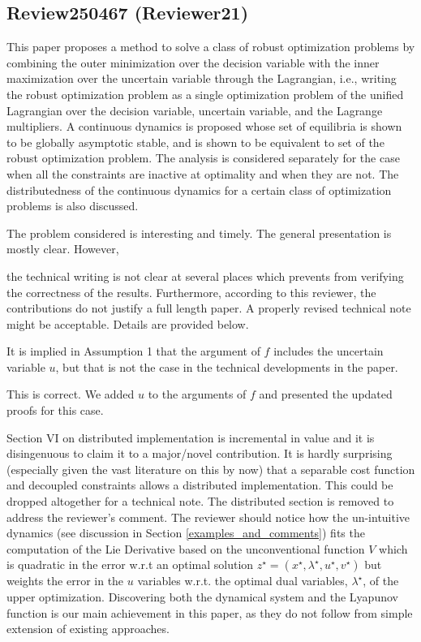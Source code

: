 \documentclass[journal,twoside,web]{ieeecolor}
\begin{document}
\subsection{Review250467 (Reviewer21)}

This paper proposes a method to solve a class of robust optimization problems by combining the outer minimization over the decision variable with the inner maximization over the uncertain variable through the Lagrangian, i.e.,  writing the robust optimization problem as a single optimization problem of the unified Lagrangian over the decision variable, uncertain variable, and the Lagrange multipliers. A continuous dynamics is proposed whose set of equilibria is shown to be globally asymptotic stable, and is shown to be equivalent to set of the robust optimization problem. The analysis is considered separately for the case when all the constraints are inactive at optimality and when they are not. The distributedness of the continuous dynamics for a certain class of optimization problems is also discussed.

The problem considered is interesting and timely. The general presentation is mostly clear. However, {\color{red}the technical writing is not clear at several places which prevents from verifying the correctness of the results. Furthermore, according to this reviewer, the contributions do not justify a full length paper. A properly revised technical note might be acceptable. Details are provided below. 

It is implied in Assumption 1 that the argument of $f$ includes the uncertain variable $u$, but that is not the case in the technical developments in the paper.} {\color{blue}This is correct. We added $u$ to the arguments of $f$ and presented the updated proofs for this case.}

{\color{red}Section VI on distributed implementation is incremental in value and it is disingenuous to claim it to a major/novel contribution. It is hardly surprising (especially given the vast literature on this by now) that a separable cost function and decoupled constraints allows a distributed implementation. This could be dropped altogether for a technical note.} {\color{blue}The distributed section is removed to address the reviewer's comment. The reviewer should notice how the un-intuitive dynamics (see discussion in Section \ref{examples_and_comments}) fits the computation of the Lie Derivative based on the unconventional function $V$ which is quadratic in the error w.r.t an optimal solution $z^\star=(x^\star,\lambda^\star,u^\star,v^\star)$ but weights the error in the $u$ variables w.r.t. the optimal dual variables, $\lambda^\star$, of the upper optimization. Discovering both the dynamical system and the Lyapunov function is our main achievement in this paper, as they do not follow from simple extension of existing approaches.}
\end{document}
